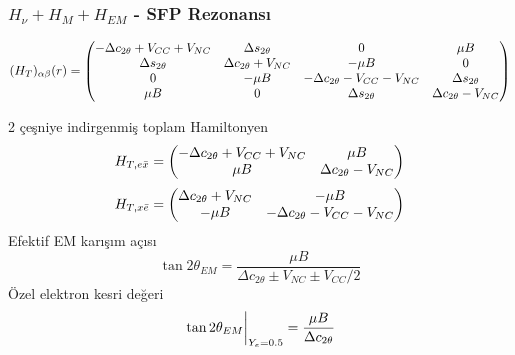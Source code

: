 \documentclass[10pt]{beamer}
\begin{document}
\begin{frame}
    \frametitle{$H_{\nu}+ H_{M}+ H_{EM}$ - SFP Rezonansı}
    \hrulefill
    
    \tiny
    \begin{equation*}
        (H_{T})_{\alpha\beta}(r) = \mqty(-\Delta c_{2\theta}+V_{CC}+V_{NC} & \Delta s_{2\theta} & 0 & \mu B\\\Delta s_{2\theta} & \Delta c_{2\theta} + V_{NC}& -\mu B & 0
        \\0 & -\mu B& -\Delta c_{2\theta}-V_{CC}-V_{NC} & \Delta s_{2\theta}\\ \mu B& 0 & \Delta s_{2\theta} & \Delta c_{2\theta}-V_{NC} )
    \end{equation*}
    \normalsize
    
    \hrulefill

    \begin{minipage}{0.45\textwidth}
        \footnotesize
        2 çeşniye indirgenmiş toplam Hamiltonyen
        \tiny
        \begin{equation*}
            H_{T,e\bar{x}} = \mqty(-\Delta c_{2\theta}+V_{CC}+V_{NC} & \mu B \\ \mu B & \Delta c_{2\theta}-V_{NC})
        \end{equation*}
        \begin{equation*}
	        H_{T,x\bar{e}} = \mqty(\Delta c_{2\theta}+V_{NC} & -\mu B \\ -\mu B & -\Delta c_{2\theta}-V_{CC}-V_{NC})
        \end{equation*}
        \footnotesize
        Efektif EM karışım açısı
        \begin{equation*}
            \tan 2\theta_{EM} = \frac{\mu B}{\Delta c_{2\theta} \pm V_{NC} \pm V_{CC}/2}
        \end{equation*}
        Özel elektron kesri değeri
        \begin{equation*}
            \eval{\tan 2\theta_{EM}}_{Y_{e}=0.5} = \frac{\mu B}{\Delta c_{2\theta}}
        \end{equation*}
        \normalsize
    \end{minipage}
    \hfill
    \begin{minipage}{0.45\textwidth}
        
    \end{minipage}
\end{frame}
\end{document}
